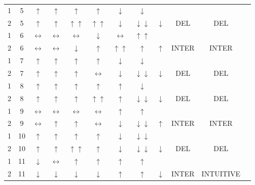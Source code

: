 \documentclass[12pt]{article}
\begin{document}
\begin{table}[htp]
\begin{tabular}{cccccccccccc}
1&5&$\uparrow$&$\uparrow$&$\uparrow$&$\uparrow$&$\downarrow$&$\downarrow$ &&& \\
2&5&$\uparrow$&$\uparrow$&$\uparrow\uparrow$&$\uparrow\uparrow$&$\downarrow$&$\downarrow\downarrow$ &\multirow{-2}{*}{$\downarrow$}&
\multirow{-2}{*}{DEL}& \multirow{-2}{*}{DEL}\\

\rowcolor{lightgray} 
1&6&$\leftrightarrow$&$\leftrightarrow$&$\leftrightarrow$&$\downarrow$&$\leftrightarrow$&$\uparrow\uparrow$ &&&\\  \rowcolor{lightgray} 
2&6&$\leftrightarrow$&$\leftrightarrow$&$\downarrow$&$\uparrow$&$\uparrow\uparrow$&$\uparrow$ &\multirow{-2}{*}{$\uparrow$}&\multirow{-2}{*}{INTER}&\multirow{-2}{*}{INTER}\\

1&7&$\uparrow$&$\uparrow$&$\uparrow$&$\uparrow$&$\downarrow$&$\downarrow$ &&& \\
2&7&$\uparrow$&$\uparrow$&$\uparrow$&$\leftrightarrow$&$\downarrow$&$\downarrow\downarrow$ &\multirow{-2}{*}{$\downarrow$}&\multirow{-2}{*}{DEL} &\multirow{-2}{*}{DEL}\\

\rowcolor{lightgray} 
1&8&$\uparrow$&$\uparrow$&$\uparrow$&$\uparrow$&$\uparrow$&$\downarrow$ &&& \\
\rowcolor{lightgray} 
2&8&$\uparrow$&$\uparrow$&$\uparrow$&$\uparrow\uparrow$&$\uparrow$&$\downarrow\downarrow$ &\multirow{-2}{*}{$\downarrow$}&\multirow{-2}{*}{DEL}&\multirow{-2}{*}{DEL}\\

1&9&$\leftrightarrow$&$\leftrightarrow$&$\leftrightarrow$&$\leftrightarrow$&$\uparrow$&$\uparrow$ &&& \\
2&9&$\leftrightarrow$&$\uparrow$&$\uparrow$&$\leftrightarrow$&$\downarrow$&$\downarrow\downarrow$ &\multirow{-2}{*}{$\uparrow$} &\multirow{-2}{*}{INTER}& \multirow{-2}{*}{INTER}\\

\rowcolor{lightgray} 
1&10&$\uparrow$&$\uparrow$&$\uparrow$&$\uparrow$&$\downarrow$&$\downarrow\downarrow$ &&&\\
\rowcolor{lightgray} 
2&10&$\uparrow$&$\uparrow$&$\uparrow\uparrow$&$\uparrow$&$\downarrow$&$\downarrow\downarrow$ & \multirow{-2}{*}{$\downarrow$}&\multirow{-2}{*}{DEL}&\multirow{-2}{*}{DEL}\\

1&11&$\downarrow$&$\leftrightarrow$&$\uparrow$&$\uparrow$&$\uparrow$&$\uparrow$ &&&\\
2&11&$\downarrow$&$\downarrow$&$\downarrow$&$\downarrow$&$\uparrow$&$\uparrow$ &\multirow{-2}{*}{$\downarrow$}&\multirow{-2}{*}{INTER}&\multirow{-2}{*}{INTUITIVE}\\


\end{tabular}
\end{table}
\end{document}
